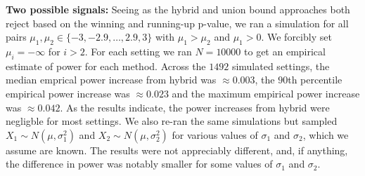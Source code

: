 \documentclass{article}
\begin{document}
\begin{appendix}
\noindent \textbf{Two possible signals: } Seeing as the hybrid and union bound approaches both reject based on the winning and running-up p-value, we ran a simulation for all pairs $\mu_1, \mu_2 \in \{-3, -2.9, \dots, 2.9, 3 \}$ with $\mu_1 > \mu_2$ and $\mu_1 > 0$. We forcibly set $\mu_i = -\infty$ for $i > 2$. For each setting we ran $N=10000$ to get an empirical estimate of power for each method. Across the $1492$ simulated settings, the median emprical power increase from hybrid was $\approx 0.003$, the $90$th percentile empirical power increase was $\approx 0.023$ and the maximum empirical power increase was $\approx 0.042$. As the results indicate, the power increases from hybrid were negligble for most settings. We also re-ran the same simulations but sampled $X_1 \sim N(\mu, \sigma_1^2)$ and $X_2 \sim N(\mu, \sigma_2^2)$ for various values of $\sigma_1$ and $\sigma_2$, which we assume are known. The results were not appreciably different, and, if anything, the difference in power was notably smaller for some values of $\sigma_1$ and $\sigma_2$.  



\end{appendix}
\end{document}
